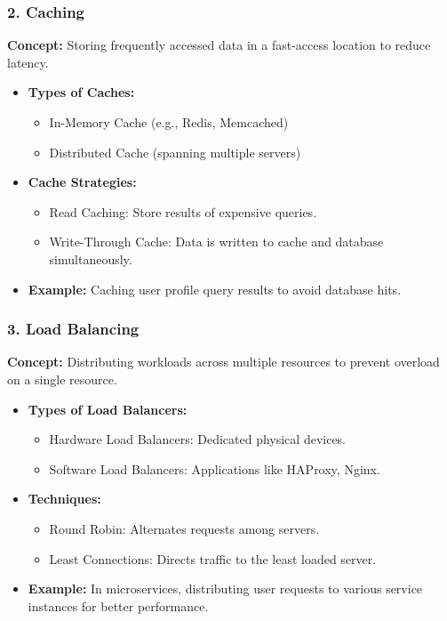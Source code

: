 \documentclass{beamer}
\begin{document}
\begin{frame}[fragile]
    \frametitle{2. Caching}
    \textbf{Concept:} Storing frequently accessed data in a fast-access location to reduce latency.

    \begin{itemize}
        \item \textbf{Types of Caches:}
        \begin{itemize}
            \item In-Memory Cache (e.g., Redis, Memcached)
            \item Distributed Cache (spanning multiple servers)
        \end{itemize}
        
        \item \textbf{Cache Strategies:}
        \begin{itemize}
            \item Read Caching: Store results of expensive queries.
            \item Write-Through Cache: Data is written to cache and database simultaneously.
        \end{itemize}
        
        \item \textbf{Example:} Caching user profile query results to avoid database hits.
    \end{itemize}
\end{frame}

\begin{frame}[fragile]
    \frametitle{3. Load Balancing}
    \textbf{Concept:} Distributing workloads across multiple resources to prevent overload on a single resource.

    \begin{itemize}
        \item \textbf{Types of Load Balancers:}
        \begin{itemize}
            \item Hardware Load Balancers: Dedicated physical devices.
            \item Software Load Balancers: Applications like HAProxy, Nginx.
        \end{itemize}
        
        \item \textbf{Techniques:}
        \begin{itemize}
            \item Round Robin: Alternates requests among servers.
            \item Least Connections: Directs traffic to the least loaded server.
        \end{itemize}
        
        \item \textbf{Example:} In microservices, distributing user requests to various service instances for better performance.
    \end{itemize}
\end{frame}
\end{document}
